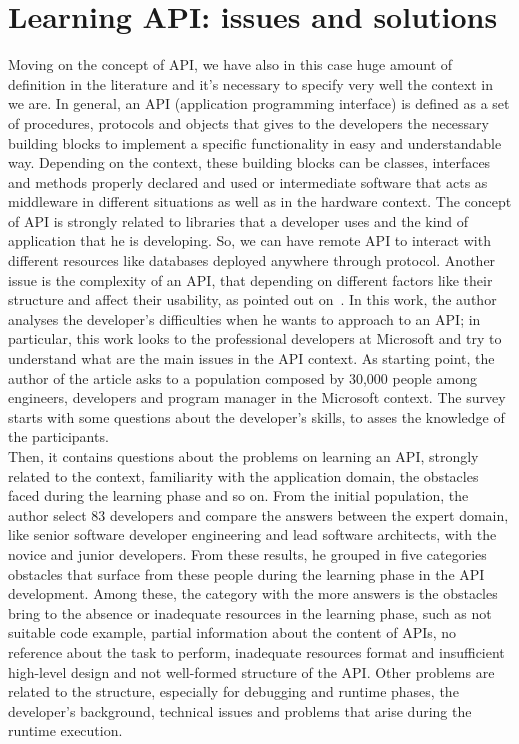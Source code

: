 \section{Learning API: issues and solutions}
Moving on the concept of API, we have also in this case huge amount of definition in the literature and it's necessary to specify very well the context in we are. In general, an API (application programming interface) is defined as a set of procedures, protocols and objects that gives to the developers the necessary building blocks to implement a specific functionality in easy and understandable way. Depending on the context, these building blocks can be classes, interfaces and methods properly declared and used or intermediate software that acts as middleware in different situations as well as in the hardware context. The concept of API is strongly related to libraries that a developer uses and the kind of application that he is developing. So, we can have remote API to interact with different resources like databases deployed anywhere through protocol. \newline
Another issue is the complexity of an API, that depending on different factors like their structure and affect their usability, as pointed out on~\cite{martin_p._robillard_what_2009}. In this work, the author analyses the developer's difficulties when he wants to approach to an API; in particular, this work looks to the professional developers at Microsoft and try to understand what are the main issues in the API context. As starting point, the author of the article asks to a population composed by 30,000 people among engineers, developers and program manager in the Microsoft context. The survey starts with some questions about the developer's skills, to asses the knowledge of the participants. \\
Then, it contains questions about the problems on learning an API, strongly related to the context, familiarity with the application domain, the obstacles faced during the learning phase and so on. From the initial population, the author select 83 developers and compare the answers between the expert domain, like senior software developer engineering and lead software architects, with the novice and junior developers. From these results, he grouped in five categories obstacles that surface from these people during the learning phase in the API development. Among these, the category with the more answers is the obstacles bring to the absence or inadequate resources in the learning phase, such as not suitable code example, partial information about the content of APIs, no reference about the task to perform, inadequate resources format and insufficient high-level design and not well-formed structure of the API. Other problems are related to the structure, especially for debugging and runtime phases, the developer's background, technical issues and problems that arise during the runtime execution.\\
